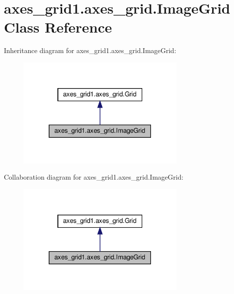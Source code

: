 \hypertarget{classaxes__grid1_1_1axes__grid_1_1ImageGrid}{}\section{axes\+\_\+grid1.\+axes\+\_\+grid.\+Image\+Grid Class Reference}
\label{classaxes__grid1_1_1axes__grid_1_1ImageGrid}


Inheritance diagram for axes\+\_\+grid1.\+axes\+\_\+grid.\+Image\+Grid\+:
\nopagebreak
\begin{figure}[H]
\begin{center}
\leavevmode
\includegraphics[width=237pt]{classaxes__grid1_1_1axes__grid_1_1ImageGrid__inherit__graph}
\end{center}
\end{figure}


Collaboration diagram for axes\+\_\+grid1.\+axes\+\_\+grid.\+Image\+Grid\+:
\nopagebreak
\begin{figure}[H]
\begin{center}
\leavevmode
\includegraphics[width=237pt]{classaxes__grid1_1_1axes__grid_1_1ImageGrid__coll__graph}
\end{center}
\end{figure}
